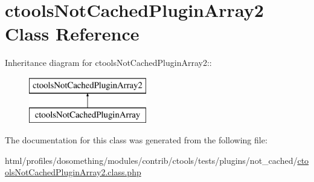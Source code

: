 \hypertarget{classctoolsNotCachedPluginArray2}{
\section{ctoolsNotCachedPluginArray2 Class Reference}
\label{classctoolsNotCachedPluginArray2}
}
Inheritance diagram for ctoolsNotCachedPluginArray2::\begin{figure}[H]
\begin{center}
\leavevmode
\includegraphics[height=2cm]{classctoolsNotCachedPluginArray2}
\end{center}
\end{figure}


The documentation for this class was generated from the following file:\begin{DoxyCompactItemize}
\item 
html/profiles/dosomething/modules/contrib/ctools/tests/plugins/not\_\-cached/\hyperlink{ctoolsNotCachedPluginArray2_8class_8php}{ctoolsNotCachedPluginArray2.class.php}\end{DoxyCompactItemize}
